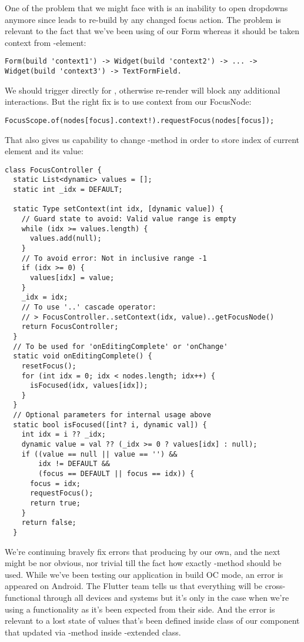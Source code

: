 One of the problem that we might face with is an inability to open dropdowns anymore since 
 leads to re-build by any changed focus action. The problem is relevant to the
fact that we've been using  of our Form whereas it should be taken context from -element:

\begin{lstlisting}
Form(build 'context1') -> Widget(build 'context2') -> ... -> Widget(build 'context3') -> TextFormField.
\end{lstlisting}

\noindent We should trigger  directly for , otherwise re-render will 
block any additional interactions. But the right fix is to use context from our FocusNode:

\begin{lstlisting}
FocusScope.of(nodes[focus].context!).requestFocus(nodes[focus]);
\end{lstlisting}

\noindent That also gives us capability to change -method in order to store index of current element 
and its value:

\begin{lstlisting}
class FocusController {
  static List<dynamic> values = [];
  static int _idx = DEFAULT;

  static Type setContext(int idx, [dynamic value]) {
    // Guard state to avoid: Valid value range is empty
    while (idx >= values.length) {
      values.add(null);
    }
    // To avoid error: Not in inclusive range -1
    if (idx >= 0) {
      values[idx] = value;
    }
    _idx = idx;
    // To use '..' cascade operator:
    // > FocusController..setContext(idx, value)..getFocusNode()
    return FocusController; 
  }
  // To be used for 'onEditingComplete' or 'onChange'
  static void onEditingComplete() {
    resetFocus();
    for (int idx = 0; idx < nodes.length; idx++) {
      isFocused(idx, values[idx]);
    }
  }
  // Optional parameters for internal usage above
  static bool isFocused([int? i, dynamic val]) {
    int idx = i ?? _idx;
    dynamic value = val ?? (_idx >= 0 ? values[idx] : null);
    if ((value == null || value == '') &&
        idx != DEFAULT &&
        (focus == DEFAULT || focus == idx)) {
      focus = idx;
      requestFocus();
      return true;
    }
    return false;
  }
\end{lstlisting}

We're continuing bravely fix errors that producing by our own, and the next might be nor obvious, nor trivial till 
the fact how exactly -method should be used. While we've been testing our application in build OC mode, an 
error is appeared on Android. The Flutter team tells us that everything will be cross-functional through all devices
and systems but it's only in the case when we're using a functionality as it's been expected from their side. And 
the error is relevant to a lost state of values that's been defined inside  class of our 
component that updated via -method inside -extended class.

